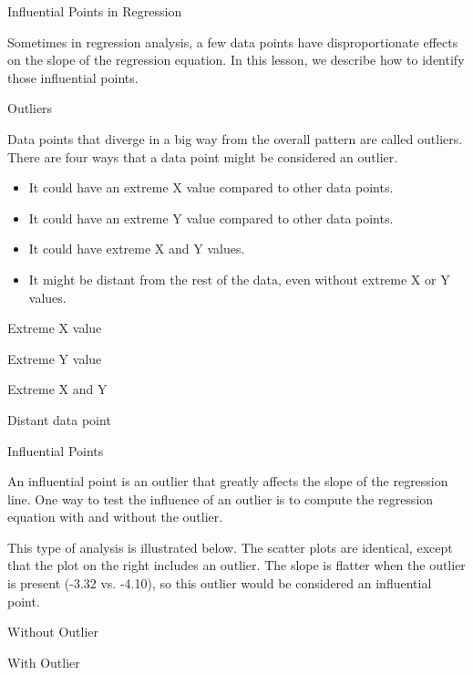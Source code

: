 Influential Points in Regression
 

Sometimes in regression analysis, a few data points have disproportionate effects on the slope of the regression equation. In this lesson, we describe how to identify those influential points.

Outliers

Data points that diverge in a big way from the overall pattern are called outliers. There are four ways that a data point might be considered an outlier.

\begin{itemize}
\item It could have an extreme X value compared to other data points.
\item It could have an extreme Y value compared to other data points.
\item It could have extreme X and Y values.
\item It might be distant from the rest of the data, even without extreme X or Y values.
\end{itemize}




Extreme X value

Extreme Y value









Extreme X and Y

Distant data point








Influential Points

An influential point is an outlier that greatly affects the slope of the regression line. One way to test the influence of an outlier is to compute the regression equation with and without the outlier.

This type of analysis is illustrated below. The scatter plots are identical, except that the plot on the right includes an outlier. The slope is flatter when the outlier is present (-3.32 vs. -4.10), so this outlier would be considered an influential point.



Without Outlier


With Outlier










